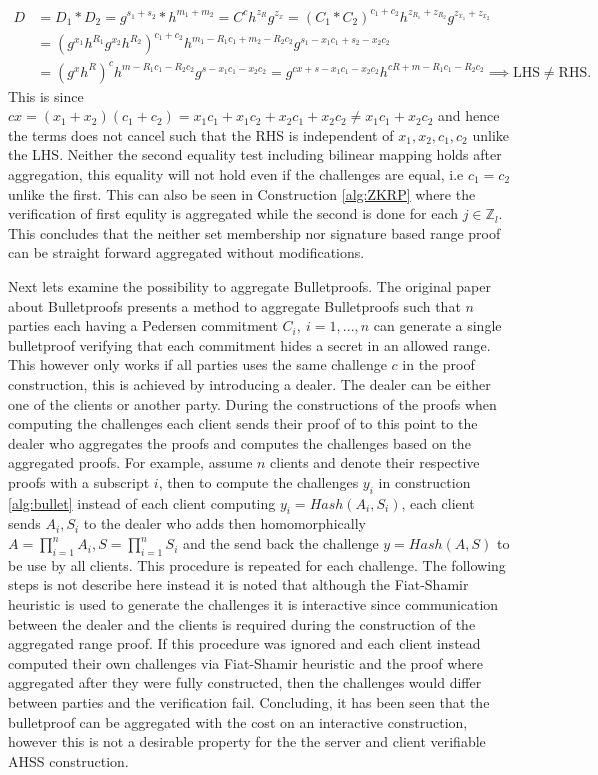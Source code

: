 \begin{align*}
D &= D_1*D_2 = g^{s_1+s_2}*h^{m_1+m_2} = C^ch^{z_R}g^{z_x} = (C_1*C_2)^{c_1+c_2}h^{z_{R_1}+z_{R_2}}g^{z_{x_1}+z_{x_2}}\\ 
&=(g^{x_1}h^{R_1}g^{x_2}h^{R_2}) ^{c_1+c_2}  h^{m_1-R_1c_1+m_2-R_2c_2} g^{s_1- x_1c_1+s_2-x_2c_2} \\
&=(g^{x}h^{R})^{c}  h^{m-R_1c_1-R_2c_2} g^{s-x_1c_1-x_2c_2} = g^{cx+s-x_1c_1-x_2c_2}h^{cR+m-R_1c_1-R_2c_2} \implies \text{LHS}\neq \text{RHS}.
\end{align*}
This is since $ cx = (x_1+x_2)(c_1+c_2) = x_1c_1+x_1c_2+x_2c_1+x_2c_2 \neq x_1c_1 + x_2c_2$ and hence the terms does not cancel such that the RHS is independent of $x_1,x_2,c_1,c_2$ unlike the LHS. Neither the  second equality test including  bilinear mapping holds after aggregation, this equality will not hold even if the challenges are equal, i.e $c_1=c_2$ unlike the first. This can also be seen in Construction \ref{alg:ZKRP} where the verification of first equlity is aggregated while the second is done for each $j\in\mathds{Z}_l$. This concludes that the neither set membership nor signature based range proof can be straight forward aggregated without modifications.  

Next lets examine the possibility to aggregate Bulletproofs. The original paper about Bulletproofs \cite{bulletProofs_theory} presents a method to aggregate Bulletproofs such that $n$ parties each having a Pedersen commitment $C_i,\: i=1,...,n$ can generate a single bulletproof verifying that each commitment hides a secret in an allowed range. This however only works if all parties uses the same challenge $c$ in the proof construction, this is achieved by introducing a dealer. The dealer can be either one of the clients or another party. During the constructions of the proofs when computing the challenges each client sends their proof of to this point to the dealer who aggregates the proofs and computes the challenges based on the aggregated proofs. For example, assume $n$ clients and denote their respective proofs with a subscript $i$, then to compute the challenges $y_i$ in construction \ref{alg:bullet} instead of each client computing $y_i = Hash(A_i,S_i)$, each client sends $A_i,S_i$ to the dealer who adds then homomorphically $A = \prod_{i=1}^n A_i, S = \prod_{i=1}^n S_i$ and the send back the challenge $y =Hash(A,S)$ to be use by all clients. This procedure is repeated for each challenge. The following steps is not describe here instead it is noted that although the Fiat-Shamir heuristic is used to generate the challenges it is interactive since communication between the dealer and the clients is required during the construction of the aggregated range proof. If this procedure was ignored and each client instead computed their own challenges via Fiat-Shamir heuristic and the proof where aggregated after they were fully constructed,  then the challenges would differ between parties and the verification fail. Concluding, it has been seen that the  bulletproof can be aggregated with the cost on an  interactive construction, however this is not a desirable property for the the server and client verifiable AHSS construction.

